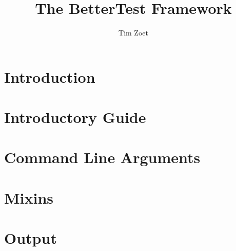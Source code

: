 \documentclass[twoside,a4paper,smallborder=true]{refart}
\title{The BetterTest Framework}
\author{Tim Zoet}
\date{}
\begin{document}
\maketitle

\tableofcontents
\newpage

\section{Introduction}
\label{section:introduction}

\newpage

\section{Introductory Guide}
\label{section:guide}

\newpage

\section{Command Line Arguments}
\label{section:cmd}

\newpage

\section{Mixins}
\label{section:mixins}

\newpage

\section{Output}
\label{section:output}

\newpage

 
 
\printindex
\end{document}
